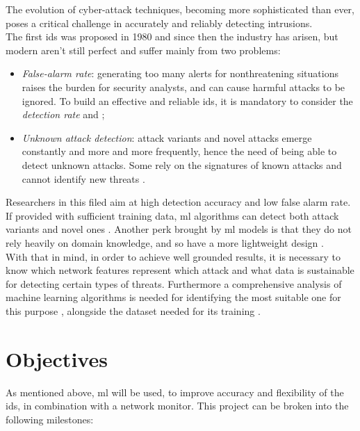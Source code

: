 The evolution of cyber-attack techniques, becoming more sophisticated than ever, poses a critical challenge in accurately and reliably detecting intrusions.\\ The first \gls{ids} was proposed in 1980 \cite{Andreson1980} and since then the industry has arisen, but modern  aren't still perfect and suffer mainly from two problems:
\begin{itemize}
    \item[\faCaretRight] \textit{False-alarm rate}: generating too many alerts for nonthreatening situations raises the burden for security analysts, and can cause harmful attacks to be ignored. To build an effective and reliable \gls{ids}, it is mandatory to consider the \textit{detection rate} \cite{Axelsson2000} and \cite{Liu2019};
    \item[\faCaretRight] \textit{Unknown attack detection}: attack variants and novel attacks emerge constantly and more and more frequently, hence the need of being able to detect unknown attacks. Some  rely on the signatures of known attacks and cannot identify new threats \cite{Hodo2017}.
\end{itemize}
Researchers in this filed aim at high detection accuracy and low false alarm rate. \\
If provided with sufficient training data, \gls{ml} algorithms can detect both attack variants and novel ones \cite{Hodo2017}. Another perk brought by \gls{ml} models is that they do not rely heavily on domain knowledge, and so have a more lightweight design \cite{Khraisat2019}. \\ With that in mind, in order to achieve well grounded results, it is necessary to know which network features represent which attack \cite{Iglesias2015} and what data is sustainable for detecting certain types of threats. Furthermore a comprehensive analysis of machine learning algorithms is needed for identifying the most suitable one for this purpose \cite{Liu2019}, alongside the dataset needed for its training \cite{Sharafaldin2019}.



\section{Objectives}
\label{sec:objectives}

As mentioned above, \gls{ml} will be used, to improve accuracy and flexibility of the \gls{ids}, in combination with a network monitor. This project can be broken into the following milestones:

